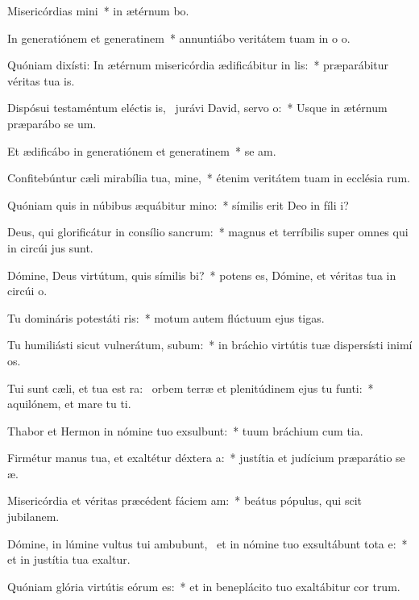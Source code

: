 \item Misericórdias mini~* in ætérnum bo.
\item In generatiónem et generatinem~* annuntiábo veritátem tuam in o o.
\item Quóniam dixísti: In ætérnum misericórdia ædificábitur in lis:~* præparábitur véritas tua  is.
\item Dispósui testaméntum eléctis is,~\pscross{} jurávi David, servo o:~* Usque in ætérnum præparábo se um.
\item Et ædificábo in generatiónem et generatinem~* se am.
\item Confitebúntur cæli mirabília tua, mine,~* étenim veritátem tuam in ecclésia rum.
\item Quóniam quis in núbibus æquábitur mino:~* símilis erit Deo in fíli i?
\item Deus, qui glorificátur in consílio sancrum:~* magnus et terríbilis super omnes qui in circúi jus sunt.
\item Dómine, Deus virtútum, quis símilis bi?~* potens es, Dómine, et véritas tua in circúi o.
\item Tu domináris potestáti ris:~* motum autem flúctuum ejus  tigas.
\item Tu humiliásti sicut vulnerátum, subum:~* in bráchio virtútis tuæ dispersísti inimí os.
\item Tui sunt cæli, et tua est ra:~\pscross{} orbem terræ et plenitúdinem ejus tu funti:~* aquilónem, et mare tu ti.
\item Thabor et Hermon in nómine tuo exsulbunt:~* tuum bráchium cum tia.
\item Firmétur manus tua, et exaltétur déxtera a:~* justítia et judícium præparátio se æ.
\item Misericórdia et véritas præcédent fáciem am:~* beátus pópulus, qui scit jubilanem.
\item Dómine, in lúmine vultus tui ambubunt,~\pscross{} et in nómine tuo exsultábunt tota e:~* et in justítia tua exaltur.
\item Quóniam glória virtútis eórum  es:~* et in beneplácito tuo exaltábitur cor trum.
